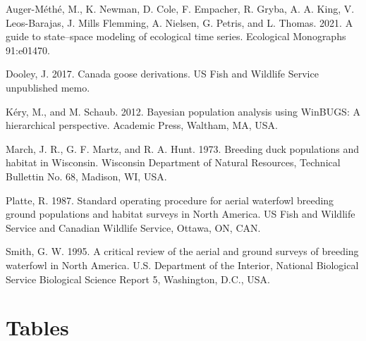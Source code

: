 \documentclass[
  12pt,
]{article}
\newlength{\cslhangindent}
\newlength{\cslentryspacingunit} %
\newenvironment{CSLReferences}[2] %
 {%
  \setlength{\parindent}{0pt}
  \ifodd #1
  \let\oldpar\par
  \def\par{\hangindent=\cslhangindent\oldpar}
  \fi
  \setlength{\parskip}{#2\cslentryspacingunit}
 }%
 {}
\begin{document}
\hypertarget{refs}{}
\begin{CSLReferences}{1}{0}
\leavevmode{}%
Auger-Méthé, M., K. Newman, D. Cole, F. Empacher, R. Gryba, A. A. King,
V. Leos-Barajas, J. Mills Flemming, A. Nielsen, G. Petris, and L.
Thomas. 2021. A guide to state--space modeling of ecological time
series. Ecological Monographs 91:e01470.

\leavevmode{}%
Dooley, J. 2017. Canada goose derivations. US Fish and Wildlife Service
unpublished memo.

\leavevmode{}%
Kéry, M., and M. Schaub. 2012. Bayesian population analysis using
WinBUGS: A hierarchical perspective. Academic Press, Waltham, MA, USA.

\leavevmode{}%
March, J. R., G. F. Martz, and R. A. Hunt. 1973. Breeding duck
populations and habitat in {Wisconsin}. Wisconsin Department of Natural
Resources, Technical Bullettin No. 68, Madison, WI, USA.

\leavevmode{}%
Platte, R. 1987. Standard operating procedure for aerial waterfowl
breeding ground populations and habitat surveys in {North America}. US
Fish and Wildlife Service and Canadian Wildlife Service, Ottawa, ON,
CAN.

\leavevmode{}%
Smith, G. W. 1995. A critical review of the aerial and ground surveys of
breeding waterfowl in {North America}. U.S. Department of the Interior,
National Biological Service Biological Science Report 5, Washington,
D.C., USA.

\end{CSLReferences}

\newpage

\hypertarget{tables}{%
\section{Tables}\label{tables}}
\end{document}
